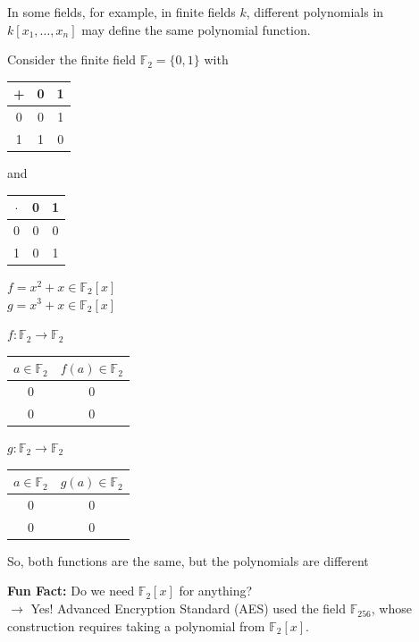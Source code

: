 \begin{remark}[title = Remark 1.1.7]
    In some fields, for example, in finite fields $k$, different polynomials in $k[x_1, \dots, x_n]$ may define the same polynomial function.
\end{remark} 

\clearpage
\begin{example}[title = Example]
Consider the finite field $\mathbb{F}_{2} = \{0, 1\}$ with 
\begin{tabular}{c| c c}
    + & 0 & 1 \\
    \hline
    0 & 0 & 1 \\
    1 & 1 & 0
\end{tabular}
and 
\begin{tabular}{c| c c}
    $\cdot$ & 0 & 1 \\
    \hline
    0 & 0 & 0 \\
    1 & 0 & 1
\end{tabular}

\vspace{0.3em} 

\begin{minipage}[t]{0.33\textwidth}
    $f = x^2 + x \in \mathbb{F}_2[x]$ \\
    $g = x^3 + x \in \mathbb{F}_2[x]$
\end{minipage}
\begin{minipage}[t]{0.33\textwidth}
  $f : \mathbb{F}_2 \to \mathbb{F}_2$

  \begin{tabular}{c |c}
    $a \in \mathbb{F}_2$ & $f(a) \in \mathbb{F}_2$ \\
    \hline
    0 & 0 \\
    0 & 0 
  \end{tabular}
\end{minipage}
\begin{minipage}[t]{0.33\textwidth}
  $g : \mathbb{F}_2 \to \mathbb{F}_2$

  \begin{tabular}{c |c}
    $a \in \mathbb{F}_2$ & $g(a) \in \mathbb{F}_2$ \\
    \hline
    0 & 0 \\
    0 & 0 
  \end{tabular}
\end{minipage}

So, both functions are the same, but the polynomials are different 
\end{example}

\textbf{Fun Fact:} Do we need $\mathbb{F}_2[x]$ for anything? \\
$\rightarrow$ Yes! Advanced Encryption Standard (AES) used the field $\mathbb{F}_{256}$, whose construction requires taking a polynomial from $\mathbb{F}_2[x]$.  

